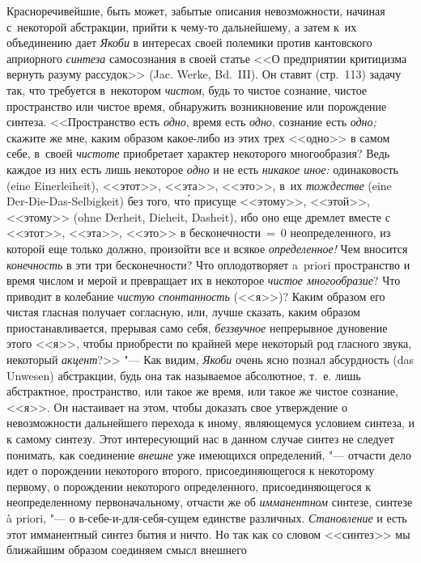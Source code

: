 Красноречивейшие, быть может, забытые описания невозможности, начиная
с~некоторой абстракции, прийти к чему-то дальнейшему, а затем к~их объединению
дает {\em Якоби} в интересах своей полемики против кантовского априорного {\em
синтеза} самосознания в своей статье <<О предприятии критицизма вернуть разуму
рассудок>> (Jac. Werke, Bd.~III). Он ставит (стр.~113) задачу так, что
требуется в~некотором {\em чистом}, будь то чистое сознание, чистое
пространство или чистое время, обнаружить возникновение или порождение синтеза.
<<Пространство есть {\em одно}, время есть {\em одно}, сознание есть {\em
одно;} скажите же мне, каким образом какое-либо из этих трех <<одно>> в самом
себе, в~своей {\em чистоте} приобретает характер некоторого многообразия? Ведь
каждое из них есть лишь некоторое {\em одно} и не есть {\em никакое иное:}
одинаковость (eine Einer\-lei\-heit), <<этот>>, <<эта>>, <<это>>, в~их
{\em тождестве} (eine Der-Die-Das-Selbigkeit) без того, чт\'{о} присуще
<<этому>>, <<этой>>, <<этому>> (ohne Derheit, Dieheit, Dasheit), ибо оно еще
дремлет вместе с <<этот>>, <<эта>>, <<это>> в бесконечности~=~0
неопределенного, из которой еще только должно, произойти все и всякое {\em
определенное!} Чем вносится {\em конечность} в эти три бесконечности? Что
оплодотворяет a~priori пространство и время числом и мерой и превращает их в
некоторое {\em чистое многообразие}? Что приводит в колебание {\em чистую
спонтанность} (<<я>>)? Каким образом его чистая гласная получает согласную,
или, лучше сказать, каким образом приостанавливается, прерывая само себя, {\em
беззвучное} непрерывное дуновение этого <<я>>, чтобы приобрести по крайней мере
некоторый род гласного звука, некоторый {\em акцент}?>> "--- Как видим, {\em
Якоби} очень ясно познал абсурдность (das Unwesen) абстракции, будь она так
называемое абсолютное, т.~е. лишь абстрактное, пространство, или такое же
время, или такое же чистое сознание, <<я>>. Он настаивает на этом, чтобы
доказать свое утверждение о невозможности дальнейшего перехода к иному,
являющемуся условием синтеза, и к самому синтезу. Этот интересующий нас в
данном случае синтез не следует понимать, как соединение {\em внешне} уже
имеющихся определений, "--- отчасти дело идет о порождении некоторого второго,
присоединяющегося к некоторому первому, о порождении некоторого определенного,
присоединяющегося к неопределенному первоначальному, отчасти же об {\em
имманентном} синтезе, синтезе à priori, "--- о в-себе-и-для-себя-сущем единстве
различных. {\em Становление} и есть этот имманентный синтез бытия и ничто. Но
так как со словом <<синтез>> мы ближайшим образом соединяем смысл внешнего
